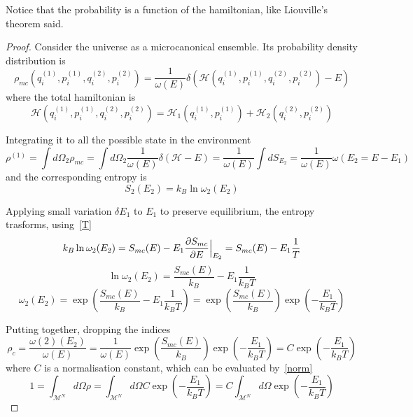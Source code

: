     Notice that the probability is a function of the hamiltonian, like Liouville's theorem said.

    \begin{proof}
        Consider the universe as a microcanonical ensemble. Its probability density distribution is 
        \begin{equation*}
            \rho_{mc} (q_i^{(1)}, p_i^{(1)}, q_i^{(2)}, p_i^{(2)}) = \frac{1}{\omega(E)} \delta (\mathcal H (q_i^{(1)}, p_i^{(1)}, q_i^{(2)}, p_i^{(2)}) - E)
        \end{equation*}
        where the total hamiltonian is 
        \begin{equation*}
            \mathcal H (q_i^{(1)}, p_i^{(1)}, q_i^{(2)}, p_i^{(2)}) = \mathcal H_1 (q_i^{(1)}, p_i^{(1)}) + \mathcal H_2 (q_i^{(2)}, p_i^{(2)})
        \end{equation*}

        Integrating it to all the possible state in the environment
        \begin{equation*}
            \rho^{(1)} = \int d\Omega_2  \rho_{mc} = \int d\Omega_2 \frac{1}{\omega(E)} \delta(\mathcal H - E) = \frac{1}{\omega(E)} \int dS_{E_2} = \frac{1}{\omega(E)} \omega(E_2 = E - E_1)
        \end{equation*}
        and the corresponding entropy is 
        \begin{equation*}
            S_2 (E_2) = k_B \ln \omega_2 (E_2)
        \end{equation*}

        Applying small variation $\delta E_1$ to $E_1$ to preserve equilibrium, the entropy trasforms, using~\eqref{T}
        \begin{equation*}
            k_B \ln \omega_2 (E_2) = S_{mc}(E) - E_1 \frac{\partial S_{mc}}{\partial E} \Big \vert_{E_2} = S_{mc}(E) - E_1 \frac{1}{T} 
        \end{equation*}
        \begin{equation*}
            \ln \omega_2 (E_2) = \frac{S_{mc}(E)}{k_B} - E_1 \frac{1}{k_B T} 
        \end{equation*}
        \begin{equation*}
            \omega_2 (E_2) = \exp (\frac{S_{mc}(E)}{k_B} - E_1 \frac{1}{k_B T}) = \exp (\frac{S_{mc}(E)}{k_B}) \exp (- \frac{E_1}{k_B T}) 
        \end{equation*}

        Putting together, dropping the indices
        \begin{equation}
            \rho_c = \frac{\omega(2)(E_2)}{\omega(E)} = \frac{1}{\omega(E)} \exp (\frac{S_{mc}(E)}{k_B}) \exp (- \frac{E_1}{k_B T}) = C \exp (- \frac{E_1}{k_B T})
        \end{equation}
        where $C$ is a normalisation constant, which can be evaluated by~\eqref{norm}
        \begin{equation*}
            1 = \int_{\mathcal M^N} d\Omega \rho = \int_{\mathcal M^N} d\Omega C \exp (- \frac{E_1}{k_B T}) = C \int_{\mathcal M^N} d\Omega \exp (- \frac{E_1}{k_B T}) 
        \end{equation*}
    \end{proof}

